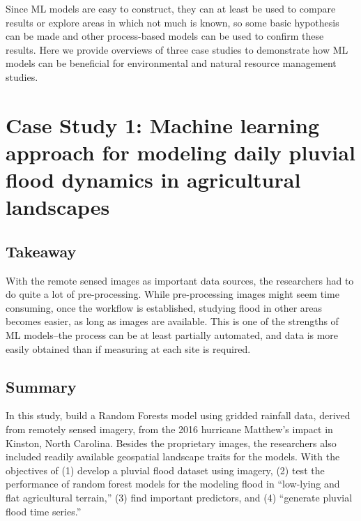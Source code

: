 \documentclass[
]{book}
\begin{document}
Since ML models are easy to construct, they can at least be used to compare results or explore areas in which not much is known, so some basic hypothesis can be made and other process-based models can be used to confirm these results. Here we provide overviews of three case studies to demonstrate how ML models can be beneficial for environmental and natural resource management studies.

\hypertarget{case-study-1-machine-learning-approach-for-modeling-daily-pluvial-flood-dynamics-in-agricultural-landscapes}{%
\section{Case Study 1: Machine learning approach for modeling daily pluvial flood dynamics in agricultural landscapes}\label{case-study-1-machine-learning-approach-for-modeling-daily-pluvial-flood-dynamics-in-agricultural-landscapes}}

\hypertarget{takeaway}{%
\subsection{Takeaway}\label{takeaway}}

With the remote sensed images as important data sources, the researchers had to do quite a lot of pre-processing. While pre-processing images might seem time consuming, once the workflow is established, studying flood in other areas becomes easier, as long as images are available. This is one of the strengths of ML models--the process can be at least partially automated, and data is more easily obtained than if measuring at each site is required.

\hypertarget{summary}{%
\subsection{Summary}\label{summary}}

In this study, \citet{fidan2023} build a Random Forests model using gridded rainfall data, derived from remotely sensed imagery, from the 2016 hurricane Matthew's impact in Kinston, North Carolina. Besides the proprietary images, the researchers also included readily available geospatial landscape traits for the models. With the objectives of (1) develop a pluvial flood dataset using imagery, (2) test the performance of random forest models for the modeling flood in ``low-lying and flat agricultural terrain,'' (3) find important predictors, and (4) ``generate pluvial flood time series.''
\end{document}
